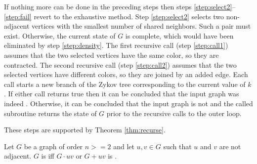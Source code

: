 If nothing more can be done in the preceding steps then steps \ref{step:select2}--\ref{step:fail} revert to the
exhaustive method.  Step \ref{step:select2} selects two non-adjacent vertices with the smallest number of shared
neighbors.  Such a pair must exist.  Otherwise, the current state of \(G\) is complete, which would have been
eliminated by step \ref{step:density}.  The first recursive call (step \ref{step:call1}) assumes that the two
selected vertices have the same color, so they are contracted.  The second recursive call (step \ref{step:call2})
assumes that the two selected vertices have different colors, so they are joined by an added edge.  Each call
starts a new branch of the Zykov tree corresponding to the current value of \(k\).  If either call returns true
then it can be concluded that the input graph was indeed .  Otherwise, it can be concluded that the
input graph is not  and the called subroutine returns the state of \(G\) prior to the recursive calls
to the outer loop.

These steps are supported by Theorem \ref{thm:recurse}.

\begin{theorem}
  \label{thm:recurse}
  Let \(G\) be a graph of order \(n>=2\) and let \(u,v\in G\) such that \(u\) and \(v\) are not adjacent.  \(G\) is
   iff \(G\cdot uv\) or \(G+uv\) is .
\end{theorem}

